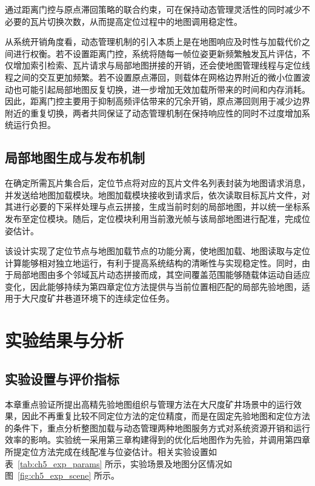 通过距离门控与原点滞回策略的联合约束，可在保持动态管理灵活性的同时减少不必要的瓦片切换次数，从而提高定位过程中的地图调用稳定性。

从系统开销角度看，动态管理机制的引入本质上是在地图响应及时性与加载代价之间进行权衡。若不设置距离门控，系统将随每一帧位姿更新频繁触发瓦片评估，不仅增加索引检索、瓦片请求与局部地图拼接的开销，还会使地图管理线程与定位线程之间的交互更加频繁。若不设置原点滞回，则载体在网格边界附近的微小位置波动也可能引起局部地图反复切换，进一步增加无效加载所带来的时间和内存消耗。因此，距离门控主要用于抑制高频评估带来的冗余开销，原点滞回则用于减少边界附近的重复切换，两者共同保证了动态管理机制在保持响应性的同时不过度增加系统运行负担。

\subsection{局部地图生成与发布机制}

在确定所需瓦片集合后，定位节点将对应的瓦片文件名列表封装为地图请求消息，并发送给地图加载模块。地图加载模块接收到请求后，依次读取目标瓦片文件，对其进行必要的下采样处理与点云拼接，生成当前时刻的局部地图，并以统一坐标系发布至定位模块。随后，定位模块利用当前激光帧与该局部地图进行配准，完成位姿估计。

该设计实现了定位节点与地图加载节点的功能分离，使地图加载、地图读取与定位计算能够相对独立地运行，有利于提高系统结构的清晰性与实现稳定性。同时，由于局部地图由多个邻域瓦片动态拼接而成，其空间覆盖范围能够随载体运动自适应变化，因此能够持续为第四章定位方法提供与当前位置相匹配的局部先验地图，适用于大尺度矿井巷道环境下的连续定位任务。

\section{实验结果与分析}

\subsection{实验设置与评价指标}

本章重点验证所提出高精先验地图组织与管理方法在大尺度矿井场景中的运行效果，因此不再重复比较不同定位方法的定位精度，而是在固定先验地图和定位方法的条件下，重点分析整图加载与动态管理两种地图服务方式对系统资源开销和运行效率的影响。实验统一采用第三章构建得到的优化后地图作为先验，并调用第四章所提定位方法完成在线配准与位姿估计。相关实验设置如表~\ref{tab:ch5_exp_params} 所示，实验场景及地图分区情况如图~\ref{fig:ch5_exp_scene} 所示。

